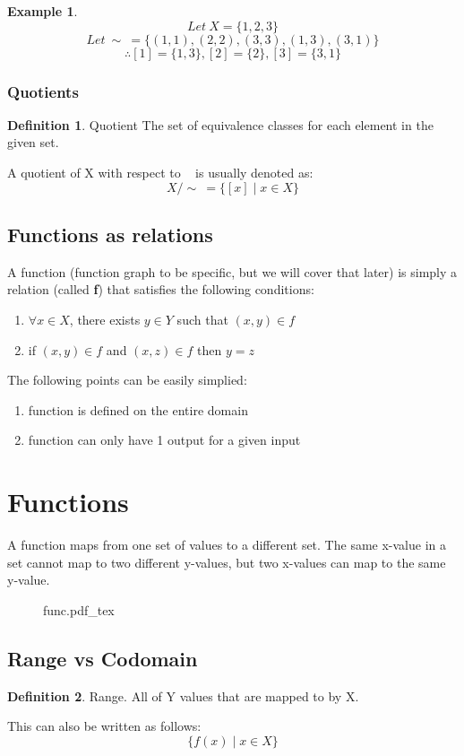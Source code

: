 \documentclass{article}
\theoremstyle{definition}
\newtheorem{df}{Definition}[section]
\newtheorem{ex}{Example}[section]
\newcommand{\incfig}[1]{%
    \def\svgwidth{\columnwidth}
    {#1.pdf_tex}
}
\begin{document}
\begin{ex}
	\[Let\ X = \{1,2,3\}\]
	\[Let\ \sim\ = \{ (1,1), (2,2), (3,3), (1,3), (3,1) \}\]
	\[\therefore [1] = \{1,3\}, [2] = \{2\}, [3] = \{3,1\}\]
\end{ex}

\subsubsection{Quotients}
\begin{df}{Quotient}
	The set of equivalence classes for each element in the given set.
\end{df}
A quotient of X with respect to ~ is usually denoted as:
\[X/\sim\ = \{[x] \mid x \in X\}\]

\subsection{Functions as relations}
A function (function graph to be specific, but we will cover that later) is simply a relation (called \textbf{f}) that satisfies the following conditions:
\begin{enumerate}
	\item $\forall x \in X$, there exists $y \in Y$ such that $(x,y) \in f$
	\item if $(x,y) \in f$ and $(x,z) \in f$ then $y=z$
\end{enumerate}
The following points can be easily simplied:
\begin{enumerate}
	\item function is defined on the entire domain
	\item function can only have 1 output for a given input
\end{enumerate}

\section{Functions}
A function maps from one set of values to a different set. The same x-value in a set cannot map to two different y-values, but two x-values can map to the same y-value.

\begin{figure}[H]
	\centering
	\incfig{func}
\end{figure}

\subsection{Range vs Codomain}
\begin{df}{Range.}
	All of Y values that are mapped to by X.
\end{df}
This can also be written as follows:
\[ \{f(x) \mid x \in X\} \]
\end{document}
